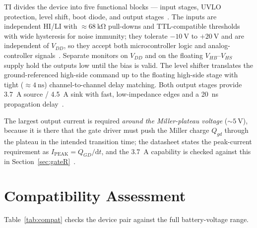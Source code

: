 \documentclass[journal,onecolumn,11pt]{IEEEtran}
\begin{document}
TI divides the device into five functional blocks --- input stages, UVLO protection, level shift,
boot diode, and output stages~\cite{ucc27211}. The inputs are independent HI/LI with
$\approx\SI{68}{\kilo\ohm}$ pull-downs and TTL-compatible thresholds with wide hysteresis for noise
immunity; they tolerate $-\SI{10}{\volt}$ to $+\SI{20}{\volt}$ and are independent of $V_{DD}$, so
they accept both microcontroller logic and analog-controller signals~\cite{ucc27211}. Separate
monitors on $V_{DD}$ and on the floating $V_{HB}$--$V_{HS}$ supply hold the outputs low until the
bias is valid. The level shifter translates the ground-referenced high-side command up to the
floating high-side stage with tight ($\approx\SI{4}{\nano\second}$) channel-to-channel delay
matching. Both output stages provide \SI{3.7}{\ampere} source / \SI{4.5}{\ampere} sink with fast,
low-impedance edges and a \SI{20}{\nano\second} propagation delay~\cite{ucc27211}.

The largest output current is required \emph{around the Miller-plateau voltage} ($\sim\SI{5}{\volt}$),
because it is there that the gate driver must push the Miller charge $Q_{gd}$ through the plateau in
the intended transition time; the datasheet states the peak-current requirement as
$I_{\mathrm{PEAK}}=Q_{GD}/\mathrm{d}t$, and the \SI{3.7}{\ampere} capability is checked against this
in Section~\ref{sec:gateR}~\cite{ucc27211,balogh}.

\section{Compatibility Assessment}\label{sec:compat}

Table~\ref{tab:compat} checks the device pair against the full battery-voltage range.
\end{document}
